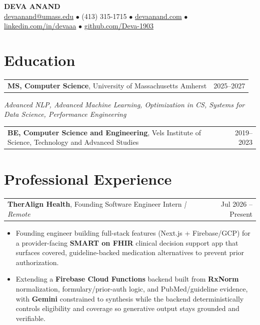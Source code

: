 \documentclass[letterpaper,11pt]{article}
\makeatletter
\newcommand{\eduItem}[3]{%
  \begin{tabular*}{\textwidth}{@{}l@{\extracolsep{\fill}}r@{}}
    \textbf{#1}, #2 & #3 \\
  \end{tabular*}\par
}
\newcommand{\expItem}[4]{%
  \vspace{2pt}
  \begin{tabular*}{\textwidth}{@{}l@{\extracolsep{\fill}}r@{}}
    \textbf{#1}, #2 \textit{| #3} & #4 \\
  \end{tabular*}\par\vspace{-3pt}
}
\makeatother
\begin{document}
\begin{center}
    {\fontsize{18}{20}\selectfont\bfseries DEVA ANAND}\\ \vspace{3pt}
    {\small
    \href{mailto:devaanand@umass.edu}{devaanand@umass.edu}
    \enspace$\bullet$\enspace
    (413) 315-1715
    \enspace$\bullet$\enspace
    \href{https://devaanand.com}{devaanand.com}
    \enspace$\bullet$\enspace
    \href{https://linkedin.com/in/devaaa/}{linkedin.com/in/devaaa}
    \enspace$\bullet$\enspace
    \href{https://github.com/Deva-1903}{github.com/Deva-1903}}
\end{center}
\vspace{-8pt}

\section{Education}
\eduItem{MS, Computer Science}{University of Massachusetts Amherst}{2025--2027}
{\small\textit{Advanced NLP, Advanced Machine Learning, Optimization in CS, Systems for Data Science, Performance Engineering}}\par
\vspace{3pt}
\eduItem{BE, Computer Science and Engineering}{Vels Institute of Science, Technology and Advanced Studies}{2019--2023}

\section{Professional Experience}

\expItem{TherAlign Health}{Founding Software Engineer Intern}{Remote}{Jul 2026 -- Present}
\begin{itemize}
  \item Founding engineer building full-stack features (Next.js + Firebase/GCP) for a provider-facing \textbf{SMART on FHIR} clinical decision support app that surfaces covered, guideline-backed medication alternatives to prevent prior authorization.
  \item Extending a \textbf{Firebase Cloud Functions} backend built from \textbf{RxNorm} normalization, formulary/prior-auth logic, and PubMed/guideline evidence, with \textbf{Gemini} constrained to synthesis while the backend deterministically controls eligibility and coverage so generative output stays grounded and verifiable.
\end{itemize}
\end{document}
